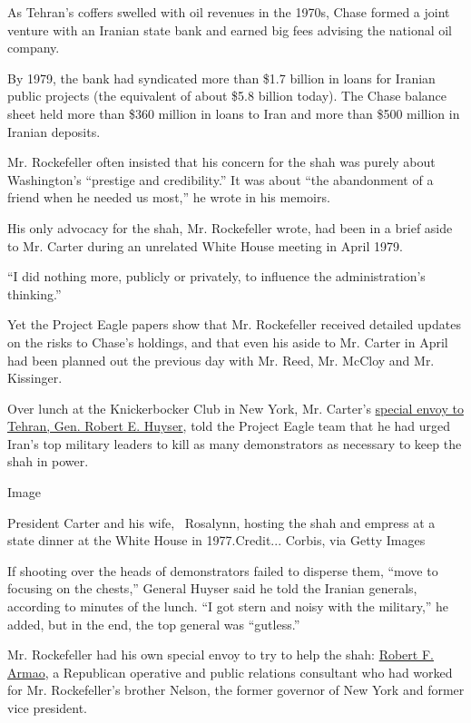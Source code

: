 As Tehran's coffers swelled with oil revenues in the 1970s, Chase formed
a joint venture with an Iranian state bank and earned big fees advising
the national oil company.

By 1979, the bank had syndicated more than \$1.7 billion in loans for
Iranian public projects (the equivalent of about \$5.8 billion today).
The Chase balance sheet held more than \$360 million in loans to Iran
and more than \$500 million in Iranian deposits.

Mr. Rockefeller often insisted that his concern for the shah was purely
about Washington's ``prestige and credibility.'' It was about ``the
abandonment of a friend when he needed us most,'' he wrote in his
memoirs.

His only advocacy for the shah, Mr. Rockefeller wrote, had been in a
brief aside to Mr. Carter during an unrelated White House meeting in
April 1979.

``I did nothing more, publicly or privately, to influence the
administration's thinking.''

Yet the Project Eagle papers show that Mr. Rockefeller received detailed
updates on the risks to Chase's holdings, and that even his aside to Mr.
Carter in April had been planned out the previous day with Mr. Reed, Mr.
McCloy and Mr. Kissinger.

Over lunch at the Knickerbocker Club in New York, Mr. Carter's
\href{https://www.nytimes.com/1979/12/08/archives/shah-says-that-us-aided-in-overthrow-memoirs-say-an-american.html}{special
envoy to Tehran, Gen. Robert E. Huyser}, told the Project Eagle team
that he had urged Iran's top military leaders to kill as many
demonstrators as necessary to keep the shah in power.

Image

President Carter and his wife,~ Rosalynn, hosting the shah and empress
at a state dinner at the White House in 1977.Credit... Corbis, via Getty
Images

If shooting over the heads of demonstrators failed to disperse them,
``move to focusing on the chests,'' General Huyser said he told the
Iranian generals, according to minutes of the lunch. ``I got stern and
noisy with the military,'' he added, but in the end, the top general was
``gutless.''

Mr. Rockefeller had his own special envoy to try to help the shah:
\href{https://www.nytimes.com/1979/08/14/archives/the-shah-gets-a-publicrelations-man-and-city-hall-loses-an-official.html}{Robert
F. Armao}, a Republican operative and public relations consultant who
had worked for Mr. Rockefeller's brother Nelson, the former governor of
New York and former vice president.

